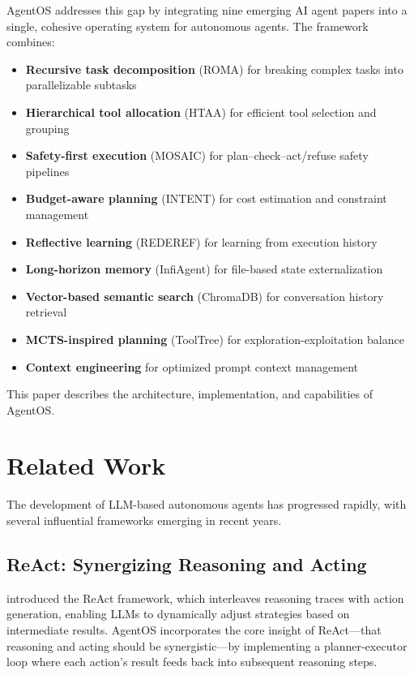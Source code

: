 \documentclass[12pt,a4paper]{article}
\begin{document}
AgentOS addresses this gap by integrating nine emerging AI agent papers into a single, cohesive operating system for autonomous agents. The framework combines:

\begin{itemize}
    \item \textbf{Recursive task decomposition} (ROMA) for breaking complex tasks into parallelizable subtasks
    \item \textbf{Hierarchical tool allocation} (HTAA) for efficient tool selection and grouping
    \item \textbf{Safety-first execution} (MOSAIC) for plan--check--act/refuse safety pipelines
    \item \textbf{Budget-aware planning} (INTENT) for cost estimation and constraint management
    \item \textbf{Reflective learning} (REDEREF) for learning from execution history
    \item \textbf{Long-horizon memory} (InfiAgent) for file-based state externalization
    \item \textbf{Vector-based semantic search} (ChromaDB) for conversation history retrieval
    \item \textbf{MCTS-inspired planning} (ToolTree) for exploration-exploitation balance
    \item \textbf{Context engineering} for optimized prompt context management
\end{itemize}

This paper describes the architecture, implementation, and capabilities of AgentOS.

\section{Related Work}

The development of LLM-based autonomous agents has progressed rapidly, with several influential frameworks emerging in recent years.

\subsection{ReAct: Synergizing Reasoning and Acting}

\citet{yao2022react} introduced the ReAct framework, which interleaves reasoning traces with action generation, enabling LLMs to dynamically adjust strategies based on intermediate results. AgentOS incorporates the core insight of ReAct---that reasoning and acting should be synergistic---by implementing a planner-executor loop where each action's result feeds back into subsequent reasoning steps.
\end{document}
